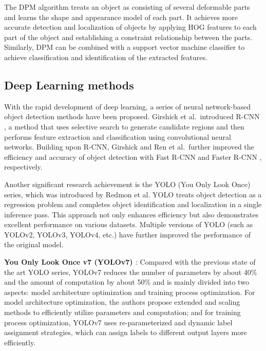 \documentclass{PHlab-thesis}
\begin{document}
The DPM algorithm treats an object as consisting of several deformable parts and learns the shape and appearance model of each part. It achieves more accurate detection and localization of objects by applying HOG features to each part of the object and establishing a constraint relationship between the parts. Similarly, DPM can be combined with a support vector machine classifier to achieve classification and identification of the extracted features.


\subsection{Deep Learning methods}
With the rapid development of deep learning, a series of neural network-based object detection methods have been proposed. Girshick et al.~introduced R-CNN \cite{girshick2014rich}, a method that uses selective search to generate candidate regions and then performs feature extraction and classification using convolutional neural networks. Building upon R-CNN, Girshick and Ren et al.~further improved the efficiency and accuracy of object detection with Fast R-CNN \cite{girshick2015fast} and Faster R-CNN \cite{ren2015faster}, respectively.

Another significant research achievement is the YOLO \cite{redmon2016you} (You Only Look Once) series, which was introduced by Redmon et al. YOLO treats object detection as a regression problem and completes object identification and localization in a single inference pass. This approach not only enhances efficiency but also demonstrates excellent performance on various datasets. Multiple versions of YOLO (such as YOLOv2, YOLOv3, YOLOv4, etc.) have further improved the performance of the original model.

\textbf{You Only Look Once v7 (YOLOv7) \cite{wang2023yolov7}}: Compared with the previous state of the art YOLO series, YOLOv7 reduces the number of parameters by about 40\% and the amount of computation by about 50\% and is mainly divided into two aspects: model architecture optimization and training process optimization. For model architecture optimization, the authors propose extended and scaling methods to efficiently utilize parameters and computation; and for training process optimization, YOLOv7 uses re-parameterized and dynamic label assignment strategies, which can assign labels to different output layers more efficiently.
\end{document}

